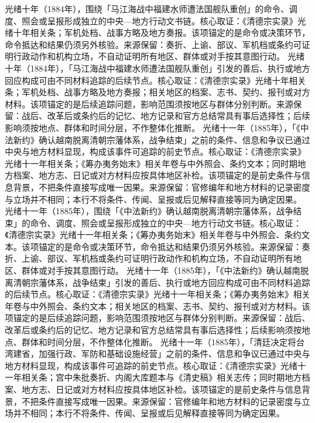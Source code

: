 光绪十年（1884年），围绕「马江海战中福建水师遭法国舰队重创」的命令、调度、照会或呈报形成独立的中央—地方行动文书链。核心取证：《清德宗实录》光绪十年相关条；军机处档、战事方略及地方奏报。该项锚定的是命令或决策环节，命令抵达和结果仍须另外核验。来源保留：奏折、上谕、部议、军机档或条约可证明行政动作和机构立场，不自动证明所有地区、群体或对手按其意图行动。
光绪十年（1884年），「马江海战中福建水师遭法国舰队重创」引发的善后、执行或地方回应构成可由不同材料追踪的后续节点。核心取证：《清德宗实录》光绪十年相关条；军机处档、战事方略及地方奏报；相关地区的档案、志书、契约、报刊或对方材料。该项锚定的是后续追踪问题，影响范围须按地区与群体分别判断。来源保留：战后、改革后或条约后的记忆、地方记录和官方总结常具有事后选择性；后续影响须按地点、群体和时间分层，不作整体化推断。
光绪十一年（1885年），「《中法新约》确认越南脱离清朝宗藩体系，战争结束」之前的条件、信息和争议已通过中央与地方材料显现，构成该事件可追踪的前史节点。核心取证：《清德宗实录》光绪十一年相关条；《筹办夷务始末》相关年卷与中外照会、条约文本；同时期地方档案、地方志、日记或对方材料应按具体地区补检。该项锚定的是前史条件与信息背景，不把条件直接写成唯一因果。来源保留：官修编年和地方材料的记录密度与立场并不相同；本行不将条件、传闻、呈报或后见解释直接等同为确定因果。
光绪十一年（1885年），围绕「《中法新约》确认越南脱离清朝宗藩体系，战争结束」的命令、调度、照会或呈报形成独立的中央—地方行动文书链。核心取证：《清德宗实录》光绪十一年相关条；《筹办夷务始末》相关年卷与中外照会、条约文本。该项锚定的是命令或决策环节，命令抵达和结果仍须另外核验。来源保留：奏折、上谕、部议、军机档或条约可证明行政动作和机构立场，不自动证明所有地区、群体或对手按其意图行动。
光绪十一年（1885年），「《中法新约》确认越南脱离清朝宗藩体系，战争结束」引发的善后、执行或地方回应构成可由不同材料追踪的后续节点。核心取证：《清德宗实录》光绪十一年相关条；《筹办夷务始末》相关年卷与中外照会、条约文本；相关地区的档案、志书、契约、报刊或对方材料。该项锚定的是后续追踪问题，影响范围须按地区与群体分别判断。来源保留：战后、改革后或条约后的记忆、地方记录和官方总结常具有事后选择性；后续影响须按地点、群体和时间分层，不作整体化推断。
光绪十一年（1885年），「清廷决定将台湾建省，加强行政、军防和基础设施经营」之前的条件、信息和争议已通过中央与地方材料显现，构成该事件可追踪的前史节点。核心取证：《清德宗实录》光绪十一年相关条；宫中朱批奏折、内阁大库题本与《清史稿》相关志传；同时期地方档案、地方志、日记或对方材料应按具体地区补检。该项锚定的是前史条件与信息背景，不把条件直接写成唯一因果。来源保留：官修编年和地方材料的记录密度与立场并不相同；本行不将条件、传闻、呈报或后见解释直接等同为确定因果。
